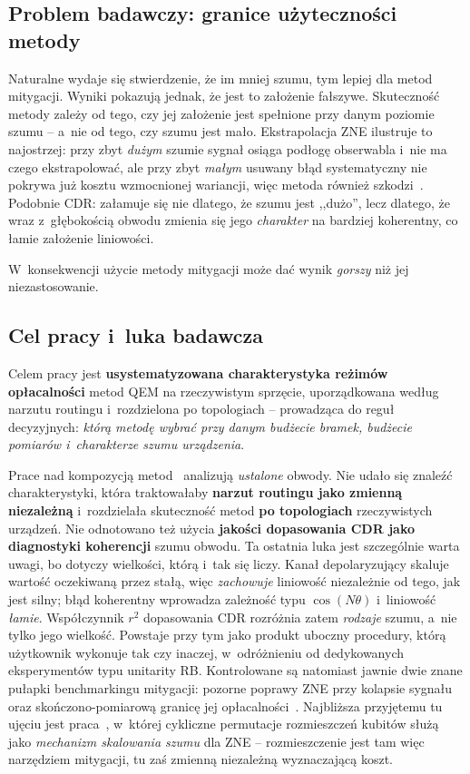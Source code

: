 \documentclass[11pt]{article}
\begin{document}
\subsection{Problem badawczy: granice użyteczności metody}

Naturalne wydaje się stwierdzenie, że im mniej szumu, tym lepiej dla metod mitygacji. Wyniki
pokazują jednak, że jest to założenie fałszywe. Skuteczność metody zależy od tego, czy jej
założenie jest spełnione przy danym poziomie szumu -- a~nie od tego, czy szumu jest mało.
Ekstrapolacja ZNE ilustruje to najostrzej: przy zbyt \emph{dużym} szumie sygnał osiąga podłogę
obserwabla i~nie ma czego ekstrapolować, ale przy zbyt \emph{małym} usuwany błąd systematyczny nie
pokrywa już kosztu wzmocnionej wariancji, więc metoda również szkodzi~\cite{alfaro2026}. Podobnie
CDR: załamuje się nie dlatego, że szumu jest ,,dużo'', lecz dlatego, że wraz z~głębokością obwodu
zmienia się jego \emph{charakter} na bardziej koherentny, co łamie założenie liniowości.

W~konsekwencji użycie metody mitygacji może dać wynik \emph{gorszy} niż jej niezastosowanie.

\subsection{Cel pracy i~luka badawcza}\label{sec:luka}

Celem pracy jest \textbf{usystematyzowana charakterystyka reżimów opłacalności} metod QEM na
rzeczywistym sprzęcie, uporządkowana według narzutu routingu i~rozdzielona po topologiach --
prowadząca do reguł decyzyjnych: \emph{którą metodę wybrać przy danym budżecie bramek, budżecie
pomiarów i~charakterze szumu urządzenia}.

Prace nad kompozycją metod~\cite{ferracin2022,lowe2021,mari2021} analizują \emph{ustalone} obwody.
Nie udało się znaleźć charakterystyki, która traktowałaby \textbf{narzut routingu jako zmienną
niezależną} i~rozdzielała skuteczność metod \textbf{po topologiach} rzeczywistych urządzeń. Nie odnotowano też użycia \textbf{jakości dopasowania CDR jako diagnostyki koherencji} szumu obwodu.
Ta ostatnia luka jest szczególnie warta uwagi, bo dotyczy wielkości, którą i~tak się liczy. Kanał
depolaryzujący skaluje wartość oczekiwaną przez stałą, więc \emph{zachowuje} liniowość niezależnie
od tego, jak jest silny; błąd koherentny wprowadza zależność typu $\cos(N\theta)$ i~liniowość
\emph{łamie}. Współczynnik $r^2$ dopasowania CDR rozróżnia zatem \emph{rodzaje} szumu, a~nie
tylko jego wielkość. Powstaje przy tym jako produkt uboczny procedury, którą użytkownik wykonuje
tak czy inaczej, w~odróżnieniu od dedykowanych eksperymentów typu unitarity RB.
Kontrolowane są natomiast jawnie dwie znane pułapki benchmarkingu mitygacji: pozorne poprawy ZNE przy
kolapsie sygnału~\cite{koster2026} oraz skończono-pomiarową granicę jej
opłacalności~\cite{alfaro2026}. Najbliższa przyjętemu tu ujęciu jest praca~\cite{sayapin2025}, w~której
cykliczne permutacje rozmieszczeń kubitów służą jako \emph{mechanizm skalowania szumu} dla ZNE --
rozmieszczenie jest tam więc narzędziem mitygacji, tu zaś zmienną niezależną wyznaczającą koszt.
\end{document}
